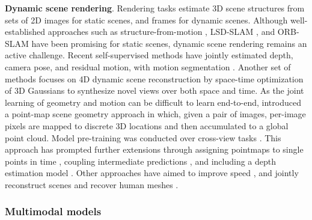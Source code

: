 \noindent
\textbf{Dynamic scene rendering}. Rendering tasks estimate 3D scene structures from sets of 2D images for static scenes, and frames for dynamic scenes. Although well-established approaches such as structure-from-motion , LSD-SLAM , and ORB-SLAM  have been promising for static scenes, dynamic scene rendering remains an active challenge. Recent self-supervised methods have jointly estimated depth, camera pose,
and residual motion, with motion segmentation . Another set of methods focuses on 4D dynamic scene reconstruction by space-time optimization of 3D Gaussians  to synthesize novel views over both space and time. As the joint learning of geometry and motion can be difficult to learn end-to-end,  introduced a point-map scene geometry approach in which, given a pair of images, per-image pixels are mapped to discrete 3D locations and then accumulated to a global point cloud. Model pre-training was conducted over cross-view tasks . This approach has prompted further extensions through assigning pointmaps to single points in time , coupling intermediate predictions , and including a depth estimation model . Other approaches have aimed to improve speed , and jointly reconstruct scenes and recover human meshes .

\subsubsection{Multimodal models}
\label{sec:recognition::audio:::mmmodels}

